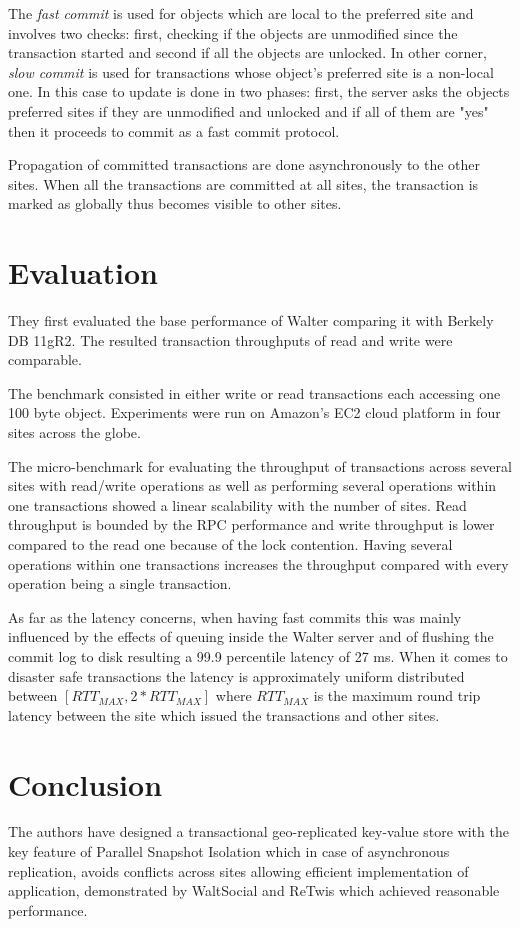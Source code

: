 \documentclass[a4paper]{article}
\begin{document}
The \textit{fast commit} is used for objects which are local to the preferred site and involves two checks: first, checking if the objects are unmodified since the transaction started and second if all the objects are unlocked. 
In other corner, \textit{slow commit} is used for transactions whose object's preferred site is a non-local one. In this case to update is done in two phases: first, the server asks the objects preferred sites if they are unmodified and unlocked and if all of them are "yes" then it proceeds to commit as a fast commit protocol. %

Propagation of committed transactions are done asynchronously to the other sites. When all the transactions are committed at all sites, the transaction is marked as globally thus becomes visible to other sites. 

\section{Evaluation}

They first evaluated the base performance of Walter comparing it with Berkely DB 11gR2. The resulted transaction throughputs of read and write were comparable.

The benchmark consisted in either write or read transactions each accessing one 100 byte object. Experiments were run on Amazon's EC2 cloud platform in four sites across the globe. 

The micro-benchmark for evaluating the throughput of transactions across several sites with read/write operations as well as performing several operations within one transactions showed a linear scalability with the number of sites. Read throughput is bounded by the RPC performance and write throughput is lower compared to the read one because of the lock contention. Having several operations within one transactions increases the throughput compared with every operation being a single transaction. 

As far as the latency concerns, when having fast commits this was mainly influenced by the effects of queuing inside the Walter server and of flushing the commit log to disk resulting a 99.9 percentile latency of 27 ms. When it comes to disaster safe transactions the latency is approximately uniform distributed between $[RTT_{MAX},2*RTT_{MAX}]$ where $RTT_{MAX}$ is the maximum round trip latency between the site which issued the transactions and other sites.


\section{Conclusion}

The authors have designed a transactional geo-replicated key-value store with the key feature of Parallel Snapshot Isolation which in case of asynchronous replication, avoids conflicts across sites allowing efficient implementation of application, demonstrated by WaltSocial and ReTwis which achieved reasonable performance.  
\end{document}
